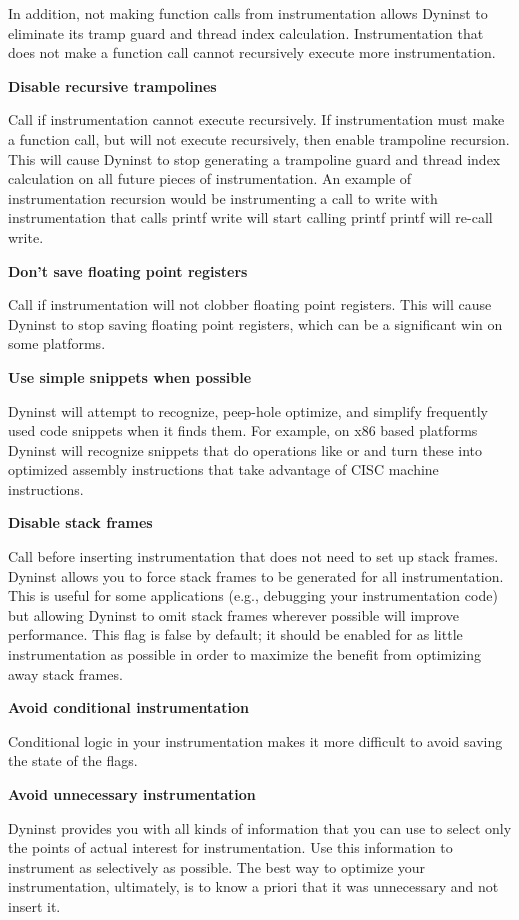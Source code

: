   In addition, not making function calls from instrumentation allows
  Dyninst to eliminate its tramp guard and thread index
  calculation. Instrumentation that does not make a function call
  cannot recursively execute more instrumentation.

  \textbf{Disable recursive trampolines}

  Call  if instrumentation cannot
  execute recursively. If instrumentation must make a
  function call, but will not execute recursively, then enable
  trampoline recursion. This will cause Dyninst to stop
  generating a trampoline guard and thread index calculation on
  all future pieces of instrumentation. An example of
  instrumentation recursion would be instrumenting a call to
  write with instrumentation that calls
  printf write will start calling printf
  printf will re-call write.

  \textbf{Don't save floating point registers}

  Call  if instrumentation will not
  clobber floating point registers. This will cause
  Dyninst to stop saving floating point registers, which can be a
  significant win on some platforms.

  \textbf{Use simple snippets when possible}

  Dyninst will attempt to recognize, peep-hole optimize, and simplify
  frequently used code snippets when it finds them. For example,
  on x86 based platforms Dyninst will recognize snippets
  that do operations like  or
   and turn these into optimized assembly instructions that
  take advantage of CISC machine instructions.

  \textbf{Disable stack frames}

  Call  before inserting
  instrumentation that does not need to set up stack frames.
  Dyninst allows you to force stack frames to be generated for
  all instrumentation. This is useful for some
  applications (e.g., debugging your instrumentation code) but
  allowing Dyninst to omit stack frames wherever possible
  will improve performance. This flag is false by default; it
  should be enabled for as little instrumentation as
  possible in order to maximize the benefit from optimizing away
  stack frames.

  \textbf{Avoid conditional instrumentation}

  Conditional logic in your instrumentation makes it more difficult to
  avoid saving the state of the flags.

  \textbf{Avoid unnecessary instrumentation}

  Dyninst provides you with all kinds of information that you can use to select
  only the points of actual interest for instrumentation. Use this
  information to instrument as selectively as possible.
  The best way to optimize your instrumentation, ultimately, is
  to know a priori that it was unnecessary and not insert it.

\setlength{\leftskip}{0cm}
